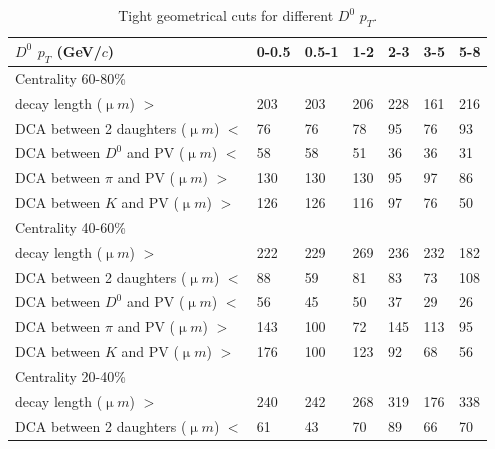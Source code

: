 \begin{table}[htp]
  \centering
  \caption{Tight geometrical cuts for different $D^0$ $p_T$.}
  \label{geometryCutsTight}
  \begin{center}
    \begin{tabular}{l|l|l|l|l|l|l}
      $D^0$ $p_T$ (GeV/$c$) & 0-0.5 & 0.5-1 & 1-2 & 2-3 & 3-5 & 5-8\\ \hline
      Centrality  60-80\% & &  & &  & & \\ \hline
      decay length (${\upmu}m$) $>$ & 203 & 203 & 206 & 228 & 161 & 216\\ \hline
      DCA between 2 daughters (${\upmu}m$) $<$ & 76 & 76 & 78 & 95 & 76 & 93\\ \hline
      DCA between $D^0$ and PV (${\upmu}m$) $<$ & 58 & 58 & 51 & 36 & 36 & 31\\ \hline
      DCA between $\pi$ and PV (${\upmu}m$) $>$ & 130 & 130 & 130 & 95 & 97 & 86\\ \hline
      DCA between $K$ and PV (${\upmu}m$) $>$ & 126 & 126 & 116 & 97 & 76 & 50\\ \hline
      Centrality  40-60\% &  &  &  &  & & \\ \hline
      decay length (${\upmu}m$) $>$ & 222 & 229 & 269 & 236 & 232 & 182\\ \hline
      DCA between 2 daughters (${\upmu}m$) $<$ & 88 & 59 & 81 & 83 & 73 & 108\\ \hline
      DCA between $D^0$ and PV (${\upmu}m$) $<$ & 56 & 45 & 50 & 37 & 29 & 26\\ \hline
      DCA between $\pi$ and PV (${\upmu}m$) $>$ & 143 & 100 & 72 & 145 & 113 & 95\\ \hline
      DCA between $K$ and PV (${\upmu}m$) $>$ & 176 & 100 & 123 & 92 & 68 & 56\\ \hline
      Centrality  20-40\% &  &  &  &  & & \\ \hline
      decay length (${\upmu}m$) $>$ & 240 & 242 & 268 & 319 & 176 & 338\\ \hline
      DCA between 2 daughters (${\upmu}m$) $<$ & 61 & 43 & 70 & 89 & 66 & 70\\ \hline

\end{tabular}
\end{center}
\end{table}
